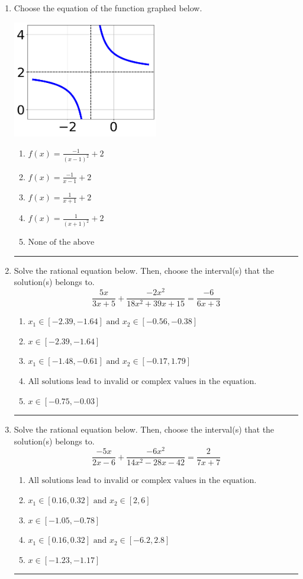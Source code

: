 \documentclass[14pt]{extbook}
\newcommand{\litem}[1]{\item#1\hspace*{-1cm}\rule{\textwidth}{0.4pt}}
\begin{document}
\begin{enumerate}
{\begin{enumerate}[label=\Alph*.]
\end{enumerate} }
\litem{
Choose the equation of the function graphed below.
\begin{center}
    \includegraphics[width=0.5\textwidth]{../Figures/rationalGraphToEquationB.png}
\end{center}
\begin{enumerate}[label=\Alph*.]
\item \( f(x) = \frac{-1}{(x - 1)^2} + 2 \)
\item \( f(x) = \frac{-1}{x - 1} + 2 \)
\item \( f(x) = \frac{1}{x + 1} + 2 \)
\item \( f(x) = \frac{1}{(x + 1)^2} + 2 \)
\item \( \text{None of the above} \)

\end{enumerate} }
\litem{
Solve the rational equation below. Then, choose the interval(s) that the solution(s) belongs to.\[ \frac{5x}{3x + 5} + \frac{-2x^{2}}{18x^{2} +39 x + 15} = \frac{-6}{6x + 3} \]\begin{enumerate}[label=\Alph*.]
\item \( x_1 \in [-2.39, -1.64] \text{ and } x_2 \in [-0.56,-0.38] \)
\item \( x \in [-2.39,-1.64] \)
\item \( x_1 \in [-1.48, -0.61] \text{ and } x_2 \in [-0.17,1.79] \)
\item \( \text{All solutions lead to invalid or complex values in the equation.} \)
\item \( x \in [-0.75,-0.03] \)

\end{enumerate} }
\litem{
Solve the rational equation below. Then, choose the interval(s) that the solution(s) belongs to.\[ \frac{-5x}{2x -6} + \frac{-6x^{2}}{14x^{2} -28 x -42} = \frac{2}{7x + 7} \]\begin{enumerate}[label=\Alph*.]
\item \( \text{All solutions lead to invalid or complex values in the equation.} \)
\item \( x_1 \in [0.16, 0.32] \text{ and } x_2 \in [2,6] \)
\item \( x \in [-1.05,-0.78] \)
\item \( x_1 \in [0.16, 0.32] \text{ and } x_2 \in [-6.2,2.8] \)
\item \( x \in [-1.23,-1.17] \)


\end{enumerate}}
\end{enumerate}
\end{document}
